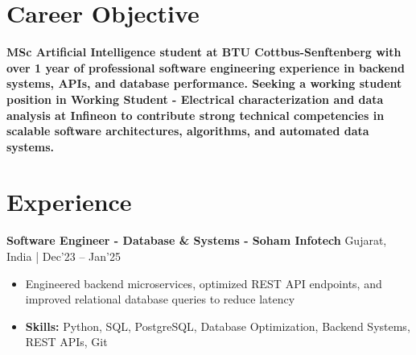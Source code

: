 \documentclass[a4paper,11pt]{article}
\begin{document}
\vspace{-7mm}

\section{\textbf{Career Objective}}
\vspace{1mm}

\textbf{MSc Artificial Intelligence student at BTU Cottbus-Senftenberg with over 1 year of professional software engineering experience in backend systems, APIs, and database performance. Seeking a working student position in Working Student - Electrical characterization and data analysis at Infineon to contribute strong technical competencies in scalable software architectures, algorithms, and automated data systems.}
\section{\textbf{Experience}}


\vspace{1mm}
  \textbf{Software Engineer - Database \& Systems - Soham Infotech} \hfill Gujarat, India | Dec'23 -- Jan'25
\vspace{-1.5mm} %
\begin{itemize}
  \item Engineered backend microservices, optimized REST API endpoints, and improved relational database queries to reduce latency


\vspace{-2mm}
  \item \textbf{Skills:} Python, SQL, PostgreSQL, Database Optimization, Backend Systems, REST APIs, Git
\end{itemize}
\end{document}
